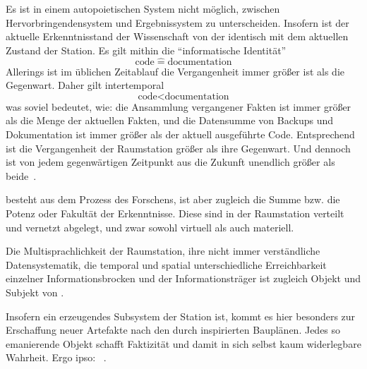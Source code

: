 \begin{newstuff}
    Es ist in einem autopoietischen System nicht möglich, zwischen Hervorbringendensystem und Ergebnissystem zu unterscheiden. Insofern ist der aktuelle Erkenntnisstand der Wissenschaft von der  identisch mit dem aktuellen Zustand der Station. Es gilt mithin die "`informatische Identität"'
    \begin{equation}
        \text{code}\;\widehat{=}\;\text{documentation}
    \end{equation}
    Allerings ist im üblichen Zeitablauf die Vergangenheit immer größer ist als die Gegenwart. Daher gilt intertemporal
    \begin{equation}
        \text{code} < \text{documentation}
    \end{equation}
    was soviel bedeutet, wie: die Ansammlung vergangener Fakten ist immer größer als die Menge der aktuellen Fakten, und die Datensumme von Backups und Dokumentation ist immer größer als der aktuell ausgeführte Code. Entsprechend ist die Vergangenheit der Raumstation größer als ihre Gegenwart. Und dennoch ist von jedem gegenwärtigen Zeitpunkt aus die Zukunft unendlich größer als beide~\cite{encyclopaedia}.


     besteht aus dem Prozess des Forschens, ist aber zugleich die Summe bzw. die Potenz oder Fakultät der Erkenntnisse. Diese sind in der Raumstation verteilt und vernetzt abgelegt, und zwar sowohl virtuell als auch materiell. 
    
    Die Multisprachlichkeit der Raumstation, ihre nicht immer verständliche Datensystematik, die temporal und spatial unterschiedliche Erreichbarkeit einzelner Informationsbrocken und der  Informationsträger ist zugleich Objekt und Subjekt von .

    Insofern  ein erzeugendes Subsystem der Station ist, kommt es hier besonders zur Erschaffung neuer Artefakte nach den durch  inspirierten Bauplänen. Jedes so emanierende Objekt schafft Faktizität und damit in sich selbst kaum widerlegbare Wahrheit. Ergo ipso: ~\cite[S.~47]{cbasebook}.
\end{newstuff}